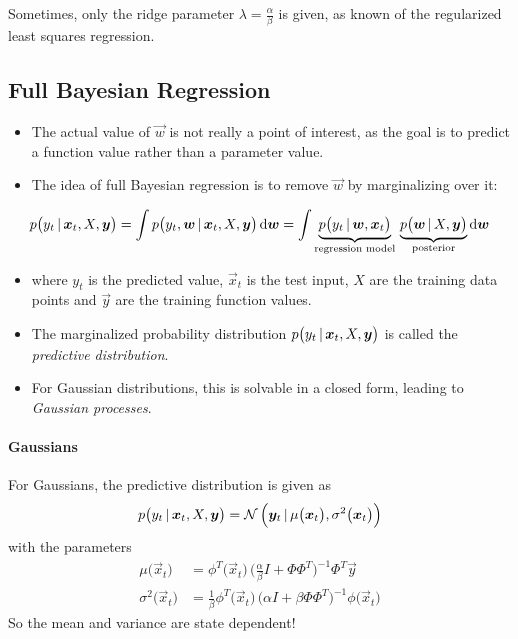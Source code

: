 			Sometimes, only the ridge parameter \(\lambda = \frac{\alpha}{\beta}\) is given, as known of the regularized least squares regression.

		\subsection{Full Bayesian Regression}
			\begin{itemize}
				\item The actual value of \(\vec{w}\) is not really a point of interest, as the goal is to predict a function value rather than a parameter value.
				\item The idea of full Bayesian regression is to remove \(\vec{w}\) by marginalizing over it:
			\end{itemize}
			\begin{equation}
				p\big(y_t \,\vert\, \bm{x}_t, X, \bm{y}\big) = \int p\big(y_t, \bm{w} \,\vert\, \bm{x}_t, X, \bm{y}\big) \dd{\bm{w}} = \int \underbrace{p\big(y_t \,\vert\, \bm{w}, \bm{x}_t\big)}_\textrm{regression model} \, \underbrace{p\big(\bm{w} \,\vert\, X, \bm{y}\big)}_\textrm{posterior} \dd{\bm{w}}
			\end{equation}
			\begin{itemize}
				\item[] where \( y_t \) is the predicted value, \( \vec{x}_t \) is the test input, \(X\) are the training data points and \(\vec{y}\) are the training function values.
				\item The marginalized probability distribution \( p\big(y_t \,\vert\, \bm{x}_t, X, \bm{y}\big) \) is called the \emph{predictive distribution}.
				\item For Gaussian distributions, this is solvable in a closed form, leading to \emph{Gaussian processes}.
			\end{itemize}

			\paragraph{Gaussians}
				For Gaussians, the predictive distribution is given as
				\begin{equation}
					p\big(y_t \,\vert\, \bm{x}_t, X, \bm{y}\big) = \mathcal{N}\,\Big(\bm{y}_t \,\vert\, \mu\big(\bm{x}_t\big), \sigma^2\big(\bm{x}_t\big)\Big)
				\end{equation}
				with the parameters
				\begin{align}
					\mu\big(\vec{x}_t\big) &= \phi^T\big(\vec{x}_t\big) \, \Bigg( \frac{\alpha}{\beta} I + \Phi\Phi^T \!\Bigg)^{-1} \Phi^T \vec{y} \\
					\sigma^2\big(\vec{x}_t\big) &= \frac{1}{\beta} \phi^T\big(\vec{x}_t\big) \, \big( \alpha I + \beta\Phi\Phi^T \big)^{-1} \phi\big(\vec{x}_t\big)
				\end{align}
				So the mean and variance are state dependent!

